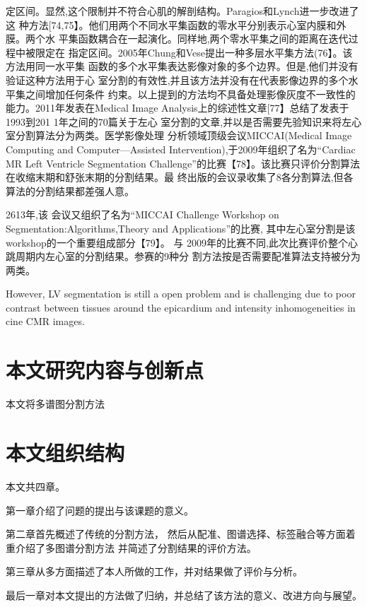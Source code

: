 定区间。显然,这个限制并不符合心肌的解剖结构。Paragios和Lynch进一步改进了这
种方法[74,75】。他们用两个不同水平集函数的零水平分别表示心室内膜和外膜。两个水
平集函数耦合在一起演化。同样地,两个零水平集之间的距离在迭代过程中被限定在
指定区间。2005年Chung和Vese提出一种多层水平集方法(76】。该方法用同一水平集
函数的多个水平集表达影像对象的多个边界。但是,他们并没有验证这种方法用于心
室分割的有效性,并且该方法并没有在代表影像边界的多个水平集之间增加任何条件
约束。以上提到的方法均不具备处理影像灰度不一致性的能力。2011年发表在Medical
Image
 Analysis上的综述性文章[77】总结了发表于1993到201 1年之间的70篇关于左心
 室分割的文章,并以是否需要先验知识来将左心室分割算法分为两类。医学影像处理
 分析领域顶级会议MICCAI(Medical
  Image Computing
   and Computer—Assisted
   Intervention),于2009年组织了名为“Cardiac MR
    Left
     Ventricle Segmentation
     Challenge”的比赛【78】。该比赛只评价分割算法在收缩末期和舒张末期的分割结果。最
     终出版的会议录收集了8各分割算法,但各算法的分割结果都差强人意。
     
2613年,该
会议又组织了名为“MICCAI
Challenge Workshop on Segmentation:Algorithms,Theory and Applications”的比赛,
其中左心室分割是该workshop的一个重要组成部分【79】。
与 2009年的比赛不同,此次比赛评价整个心跳周期内左心室的分割结果。参赛的9种分
割方法按是否需要配准算法支持被分为两类。


However, LV segmentation is still a open problem and is challenging due to poor
contrast between tissues around the epicardium and intensity inhomogeneities
in cine CMR images.

\section{本文研究内容与创新点}
本文将多谱图分割方法


\section{本文组织结构}
本文共四章。

第一章介绍了问题的提出与该课题的意义。

第二章首先概述了传统的分割方法，
然后从配准、图谱选择、标签融合等方面着重介绍了多图谱分割方法
并简述了分割结果的评价方法。

第三章从多方面描述了本人所做的工作，并对结果做了评价与分析。

最后一章对本文提出的方法做了归纳，并总结了该方法的意义、改进方向与展望。


